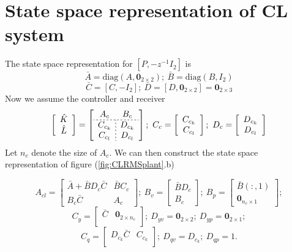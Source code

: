

\section{State space representation of CL system}
The state space representation for $[P,-z^{-1}I_2]$ is
$$
\bar{A}=\mathrm{diag}(A,\mathbf{0}_{2\times2});\ \bar{B}=\mathrm{diag}(B,I_{2})
$$
$$
\bar{C} = [C,-I_2];\ \bar{D}=[D,\mathbf{0}_{2\times2}]=\mathbf{0}_{2\times3}
$$
Now we assume the controller and receiver 
$$
\left[\begin{array}{c}
    \hat{K}  \\
    \hat{L} 
\end{array}\right]
=\left[\begin{array}{c;{2pt/2pt}c}
    A_c & B_c\\ \hdashline[2pt/2pt]
    C_{c_k} & D_{c_k} \\
    C_{c_l} & D_{c_l}
\end{array}\right];\ 
C_c =\left[\begin{array}{c}
    C_{c_k}  \\
     C_{c_l} 
\end{array}\right];\ 
D_c =\left[\begin{array}{c}
    D_{c_k}  \\
    D_{c_l} 
\end{array}\right]
$$
Let $n_c$ denote the size of $A_c$. We can then construct the state space representation of figure (\ref{fig:CLRMSplant}.b)

$$
A_{cl} = \left[\begin{array}{cc}
            \bar{A}+\bar{B}D_c\bar{C} & \bar{B}C_c\\
            B_c\bar{C} & A_c 
        \end{array}\right]; \ 
B_v = \left[\begin{array}{c}
    \bar{B}D_c  \\
    B_c
\end{array}\right];\ 
B_p = \left[\begin{array}{c}
    \bar{B}(:,1)  \\
    \mathbf{0}_{n_c\times1}
\end{array}\right];
$$
$$
C_y = \left[\begin{array}{cc}
            \bar{C} & \mathbf{0}_{2\times n_c}\\
        \end{array}\right]; \ 
D_{yv} =\mathbf{0}_{2\times 2};\ D_{yp} =\mathbf{0}_{2\times 1};
$$
$$
C_q = \left[\begin{array}{cc}
            D_{c_k}\bar{C} & C_{c_k}\\
        \end{array}\right]; \
D_{qv} =D_{c_k};\ D_{qp} =1.
$$

